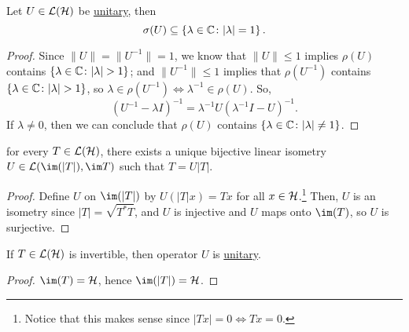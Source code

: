 \begin{proposition}
	Let \(U\in \mathcal{\MakeUppercase{l}} (\mathcal{\MakeUppercase{h}} )\) be \hyperref[def:unitary-op]{unitary}, then
	\[
		\sigma (U) \subseteq \left\{ \lambda \in \mathbb{\MakeUppercase{c}} \colon \vert \lambda  \vert = 1 \right\}.
	\]
\end{proposition}
\begin{proof}
	Since \(\lVert U \rVert = \lVert U^{-1}  \rVert = 1\), we know that \(\lVert U \rVert \leq 1\) implies \(\rho (U)\) contains \(\left\{ \lambda \in \mathbb{\MakeUppercase{c}} \colon \vert \lambda \vert > 1 \right\} \); and \(\lVert U^{-1}  \rVert \leq 1\) implies that \(\rho (U^{-1} )\) contains \(\left\{ \lambda \in \mathbb{\MakeUppercase{c}} \colon \vert \lambda  \vert > 1 \right\} \), so \(\lambda \in \rho (U^{-1} ) \iff \lambda ^{-1} \in \rho (U)\). So,
	\[
		(U ^{-1}  - \lambda I)^{-1} = \lambda ^{-1} U(\lambda ^{-1} I- U)^{-1} .
	\]
	If \(\lambda \neq 0\), then we can conclude that \(\rho (U)\) contains \(\left\{ \lambda \in \mathbb{\MakeUppercase{c}} \colon \vert \lambda  \vert \neq 1 \right\} \).
\end{proof}

\begin{theorem}\label{thm:polar-decomposition}for every \(T\in \mathcal{\MakeUppercase{l}} (\mathcal{\MakeUppercase{h}} )\), there exists a unique bijective linear isometry \(U\in \mathcal{\MakeUppercase{l}} (\im (\vert T \vert ), \im T)\) such that \(T = U\vert T \vert \).
\end{theorem}
\begin{proof}
	Define \(U\) on \(\im(\vert T \vert )\) by \(U(\vert T \vert x) = Tx\) for all \(x\in \mathcal{\MakeUppercase{h}} \).\footnote{Notice that this makes sense since \(\vert Tx \vert = 0 \iff Tx = 0\).} Then, \(U\) is an isometry since \(\vert T \vert = \sqrt{T ^{\ast} T} \), and \(U\) is injective and \(U\) maps onto \(\im (T)\), so \(U\) is surjective.
\end{proof}

\begin{corollary}
	If \(T\in \mathcal{\MakeUppercase{l}} (\mathcal{\MakeUppercase{h}} )\) is invertible, then operator \(U\) is \hyperref[def:unitary-op]{unitary}.
\end{corollary}
\begin{proof}
	\(\im(T) = \mathcal{\MakeUppercase{h}} \), hence \(\im(\vert T \vert ) = \mathcal{\MakeUppercase{h}} \).
\end{proof}

